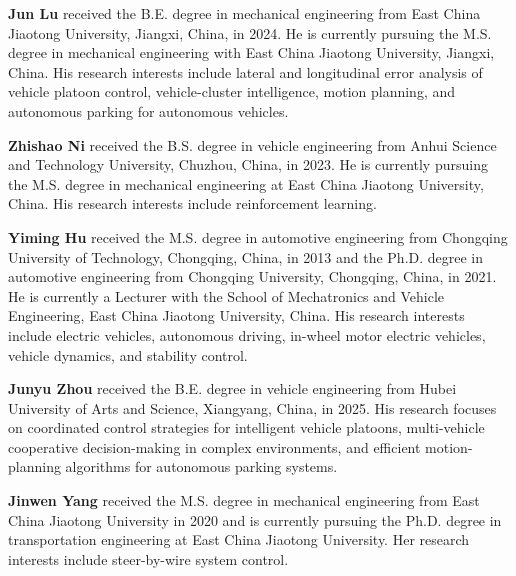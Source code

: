 \documentclass[twocolumn,3p,times,procedia]{elsarticle}
\begin{document}
\smallskip
\noindent\textbf{Jun Lu} received the B.E. degree in mechanical engineering from East China Jiaotong University, Jiangxi, China, in 2024. He is currently pursuing the M.S. degree in mechanical engineering with East China Jiaotong University, Jiangxi, China. His research interests include lateral and longitudinal error analysis of vehicle platoon control, vehicle-cluster intelligence, motion planning, and autonomous parking for autonomous vehicles.

\smallskip
\noindent\textbf{Zhishao Ni} received the B.S. degree in vehicle engineering from Anhui Science and Technology University, Chuzhou, China, in 2023. He is currently pursuing the M.S. degree in mechanical engineering at East China Jiaotong University, China. His research interests include reinforcement learning.

\smallskip
\noindent\textbf{Yiming Hu} received the M.S. degree in automotive engineering from Chongqing University of Technology, Chongqing, China, in 2013 and the Ph.D. degree in automotive engineering from Chongqing University, Chongqing, China, in 2021. He is currently a Lecturer with the School of Mechatronics and Vehicle Engineering, East China Jiaotong University, China. His research interests include electric vehicles, autonomous driving, in-wheel motor electric vehicles, vehicle dynamics, and stability control.

\smallskip
\noindent\textbf{Junyu Zhou} received the B.E. degree in vehicle engineering from Hubei University of Arts and Science, Xiangyang, China, in 2025. His research focuses on coordinated control strategies for intelligent vehicle platoons, multi-vehicle cooperative decision-making in complex environments, and efficient motion-planning algorithms for autonomous parking systems.

\smallskip
\noindent\textbf{Jinwen Yang} received the M.S. degree in mechanical engineering from East China Jiaotong University in 2020 and is currently pursuing the Ph.D. degree in transportation engineering at East China Jiaotong University. Her research interests include steer-by-wire system control.
\end{document}
